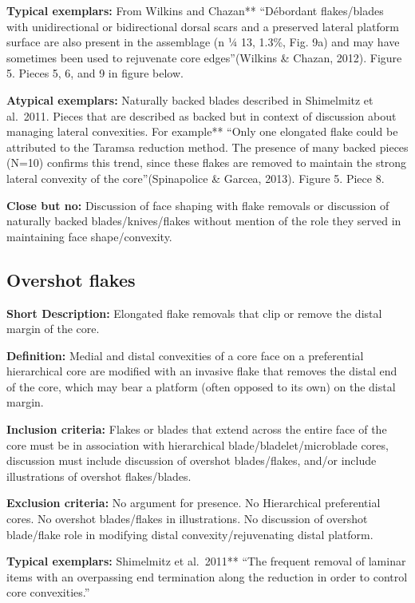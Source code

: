 \documentclass[
]{article}
\begin{document}
\textbf{Typical exemplars:} From Wilkins and Chazan** ``Débordant
flakes/blades with unidirectional or bidirectional dorsal scars and a
preserved lateral platform surface are also present in the assemblage (n
¼ 13, 1.3\%, Fig. 9a) and may have sometimes been used to rejuvenate
core edges''(Wilkins \& Chazan, 2012). Figure 5. Pieces 5, 6, and 9 in
figure below.

\textbf{Atypical exemplars:} Naturally backed blades described in
Shimelmitz et al.~2011. Pieces that are described as backed but in
context of discussion about managing lateral convexities. For example**
``Only one elongated flake could be attributed to the Taramsa reduction
method. The presence of many backed pieces (N=10) confirms this trend,
since these flakes are removed to maintain the strong lateral convexity
of the core''(Spinapolice \& Garcea, 2013). Figure 5. Piece 8.

\textbf{Close but no:} Discussion of face shaping with flake removals or
discussion of naturally backed blades/knives/flakes without mention of
the role they served in maintaining face shape/convexity.

\hypertarget{overshot-flakes}{%
\subsection{Overshot flakes}\label{overshot-flakes}}

\textbf{Short Description:} Elongated flake removals that clip or remove
the distal margin of the core.

\textbf{Definition:} Medial and distal convexities of a core face on a
preferential hierarchical core are modified with an invasive flake that
removes the distal end of the core, which may bear a platform (often
opposed to its own) on the distal margin.

\textbf{Inclusion criteria:} Flakes or blades that extend across the
entire face of the core must be in association with hierarchical
blade/bladelet/microblade cores, discussion must include discussion of
overshot blades/flakes, and/or include illustrations of overshot
flakes/blades.

\textbf{Exclusion criteria:} No argument for presence. No Hierarchical
preferential cores. No overshot blades/flakes in illustrations. No
discussion of overshot blade/flake role in modifying distal
convexity/rejuvenating distal platform.

\textbf{Typical exemplars:} Shimelmitz et al.~2011** ``The frequent
removal of laminar items with an overpassing end termination along the
reduction in order to control core convexities.''
\end{document}
